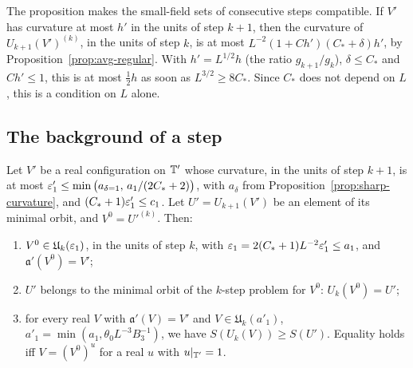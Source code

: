 The proposition makes the small-field sets of consecutive steps compatible. If $V'$ has curvature at most $h'$ in the units of step $k+1$, then the curvature of $U_{k+1}(V')^{(k)}$, in the units of step $k$, is at most $L^{-2}(1+Ch')(C_*+\delta)h'$, by Proposition~\ref{prop:avg-regular}. With $h'=L^{1/2}h$ (the ratio $g_{k+1}/g_k$), $\delta\le C_*$ and $Ch'\le1$, this is at most $\frac12h$ as soon as $L^{3/2}\ge8C_*$. Since $C_*$ does not depend on $L$, this is a condition on $L$ alone.

\subsection{The background of a step}

\begin{lemma}\label{lem:composition}
Let $V'$ be a real configuration on $\mathbb T'$ whose curvature, in the units of step $k+1$, is at most $\varepsilon'_1\le\min\big(a_{\delta=1},\,a_1/(2C_*+2)\big)$, with $a_\delta$ from Proposition~\ref{prop:sharp-curvature}, and $(C_*+1)\varepsilon'_1\le c_1$. Let $U'=U_{k+1}(V')$ be an element of its minimal orbit, and $V^0=U'^{(k)}$. Then:
\begin{enumerate}[label=(\alph*)]
\item $V^0\in\mathfrak U_k(\varepsilon_1)$, in the units of step $k$, with $\varepsilon_1=2(C_*+1)L^{-2}\varepsilon'_1\le a_1$, and $\mathfrak a'(V^0)=V'$;
\item $U'$ belongs to the minimal orbit of the $k$-step problem for $V^0$: $U_k(V^0)=U'$;
\item for every real $V$ with $\mathfrak a'(V)=V'$ and $V\in\mathfrak U_k(a'_1)$, $a'_1=\min(a_1,\theta_0L^{-3}B_3^{-1})$, we have $S(U_k(V))\ge S(U')$. Equality holds iff $V=(V^0)^u$ for a real $u$ with $u|_{\mathbb T'}=1$.
\end{enumerate}
\end{lemma}

